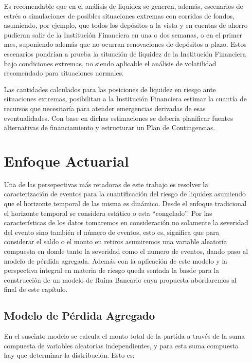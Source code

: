 \documentclass[10pt,]{article}
\begin{document}
Es recomendable que en el análisis de liquidez se generen, además,
escenarios de estrés o simulaciones de posibles situaciones extremas con
corridas de fondos, asumiendo, por ejemplo, que todos los depósitos a la
vista y en cuentas de ahorro pudieran salir de la Institución Financiera
en una o dos semanas, o en el primer mes, suponiendo además que no
ocurran renovaciones de depósitos a plazo. Estos escenarios pondrían a
prueba la situación de liquidez de la Institución Financiera bajo
condiciones extremas, no siendo aplicable el análisis de volatilidad
recomendado para situaciones normales.

Las cantidades calculados para las posiciones de liquidez en riesgo ante
situaciones extremas, posibilitan a la Institución Financiera estimar la
cuantía de recursos que necesitaría para atender emergencias derivadas
de esas eventualidades. Con base en dichas estimaciones se debería
planificar fuentes alternativas de financiamiento y estructurar un Plan
de Contingencias.

\hypertarget{enfoque-actuarial}{%
\section{Enfoque Actuarial}\label{enfoque-actuarial}}

Una de las persepectivas más retadoras de este trabajo es resolver la
caracterización de eventos para la cuantificación del riesgo de liquidez
asumiendo que el horizonte temporal de las misma es dinámico. Desde el
enfoque tradicional el horizonte temporal se considera estático o esta
``congelado''. Por las características de los datos tomaremos en
consideración no solamente la severidad del evento sino también el
número de eventos, esto es, significa que para considerar el saldo o el
monto en retiros asumiremos una variable aleatoria compuesta en donde
tanto la severidad como el numero de eventos, dando paso al modelo de
pérdida agregada. Además con la aplicación de este modelo y la
perspectiva integral en materia de riesgo queda sentada la basde para la
construcción de un modelo de Ruina Bancario cuya propuesta abordaremos
al final de este capítulo.

\hypertarget{modelo-de-perdida-agregado}{%
\subsection{Modelo de Pérdida
Agregado}\label{modelo-de-perdida-agregado}}

En el suscinto modelo se calcula el monto total de la partida a través
de la suma compuesta de variables aleatorias independientes, y para esta
suma compuesta hay que determinar la distribución. Esto es:
\end{document}
